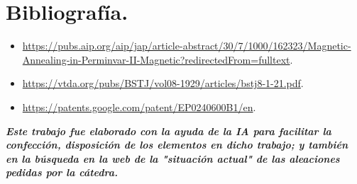 \documentclass[12pt,a4paper]{article}
\begin{document}
\section{Bibliografía.}

\begin{itemize}
    \item \url{https://pubs.aip.org/aip/jap/article-abstract/30/7/1000/162323/Magnetic-Annealing-in-Perminvar-II-Magnetic?redirectedFrom=fulltext}.
    \item \url{https://vtda.org/pubs/BSTJ/vol08-1929/articles/bstj8-1-21.pdf}.
    \item \url{https://patents.google.com/patent/EP0240600B1/en}.
\end{itemize}

\vfill
\textit{\textbf{Este trabajo fue elaborado con la ayuda de la IA para facilitar la confección, disposición de los elementos en dicho trabajo; y también en la búsqueda en la web de la "situación actual" de las aleaciones pedidas por la cátedra.}}
\end{document}
